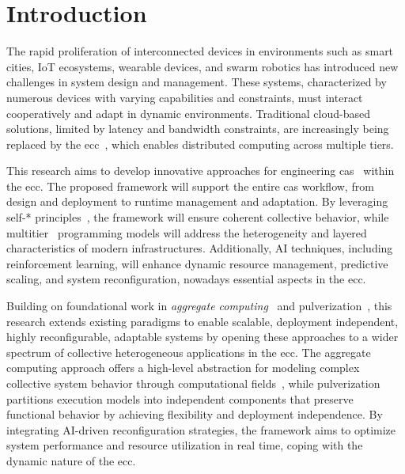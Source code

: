 \documentclass[runningheads]{llncs}
\begin{document}
\section{Introduction}
\label{sec:introduction}
The rapid proliferation of interconnected devices in environments such as smart cities,
IoT ecosystems,
wearable devices,
and swarm robotics has introduced new challenges in system design and management.
%
These systems,
characterized by numerous devices with varying capabilities and constraints,
must interact cooperatively and adapt in dynamic environments.
%
Traditional cloud-based solutions,
limited by latency and bandwidth constraints,
are increasingly being replaced by the \ac{ecc}~\cite{DBLP:journals/access/MoreschiniPLNHT22},
which enables distributed computing across multiple tiers.

This research aims to develop innovative approaches for engineering \ac{cas}~\cite{DBLP:conf/birthday/BucchiaroneM19} within the \ac{ecc}.
%
The proposed framework will support the entire \ac{cas} workflow,
from design and deployment to runtime management and adaptation.
%
By leveraging self-* principles~\cite{DBLP:conf/bertinoro/BabaogluJMFLM05},
the framework will ensure coherent collective behavior,
while multitier~\cite{DBLP:journals/csur/WeisenburgerWS20} programming models will address the heterogeneity and layered characteristics of modern infrastructures.
%
Additionally,
AI techniques,
including reinforcement learning,
will enhance dynamic resource management,
predictive scaling,
and system reconfiguration,
nowadays essential aspects in the \ac{ecc}.

Building on foundational work in \emph{aggregate computing}~\cite{DBLP:journals/computer/BealPV15} and pulverization~\cite{DBLP:journals/fi/CasadeiPPVW20,DBLP:journals/iotj/CasadeiFPPSV22},
this research extends existing paradigms to enable scalable,
deployment independent,
highly reconfigurable,
adaptable systems by opening these approaches to a wider spectrum of collective heterogeneous applications in the \ac{ecc}.
%
The aggregate computing approach offers a high-level abstraction for modeling complex collective system behavior through computational fields~\cite{DBLP:journals/tocl/AudritoVDPB19},
while pulverization partitions execution models into independent components that preserve functional behavior by achieving flexibility and deployment independence.
%
By integrating AI-driven reconfiguration strategies,
the framework aims to optimize system performance and resource utilization in real time,
coping with the dynamic nature of the \ac{ecc}.
\end{document}
